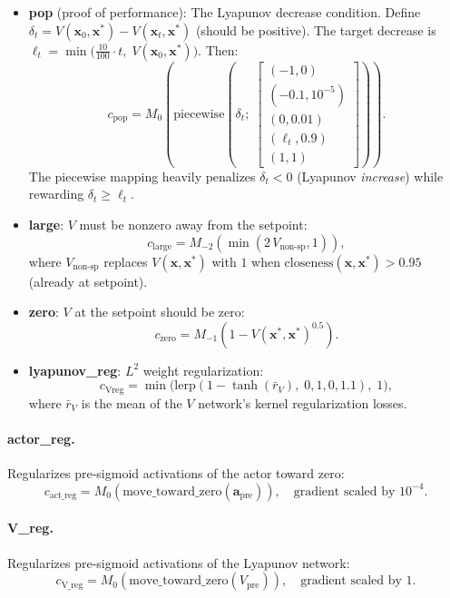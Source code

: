 \documentclass[11pt]{article}
\newcommand{\pmean}[2]{M_{#1}\!\left(#2\right)}
\newcommand{\x}{\bm{x}}
\newcommand{\xstar}{\bm{x}^*}
\theoremstyle{definition}
\begin{document}
\begin{itemize}
    \item \textbf{pop} (proof of performance): The Lyapunov decrease condition.
    Define $\delta_t = V(\x_0, \xstar) - V(\x_t, \xstar)$ (should be positive).
    The target decrease is $\ell_t = \min\!\bigl(\tfrac{10}{100} \cdot t,\; V(\x_0, \xstar)\bigr)$.
    Then:
    \[
        c_{\text{pop}} = \pmean{0}{\text{piecewise}\!\left(
        \delta_t;\;
        \begin{bmatrix}(-1, 0)\\(-0.1, 10^{-5})\\(0, 0.01)\\(\ell_t, 0.9)\\(1, 1)\end{bmatrix}
        \right)}.
    \]
    The piecewise mapping heavily penalizes $\delta_t < 0$ (Lyapunov \emph{increase})
    while rewarding $\delta_t \geq \ell_t$.

    \item \textbf{large}: $V$ must be nonzero away from the setpoint:
    \[
        c_{\text{large}} = \pmean{-2}{\min(2\,V_{\text{non-sp}}, 1)},
    \]
    where $V_{\text{non-sp}}$ replaces $V(\x, \xstar)$ with $1$ when
    $\text{closeness}(\x, \xstar) > 0.95$ (already at setpoint).

    \item \textbf{zero}: $V$ at the setpoint should be zero:
    \[
        c_{\text{zero}} = \pmean{-1}{1 - V(\xstar, \xstar)^{0.5}}.
    \]

    \item \textbf{lyapunov\_reg}: $L^2$ weight regularization:
    \[
        c_{\text{Vreg}} = \min\!\bigl(\text{lerp}(1 - \tanh(\bar{r}_V),\; 0, 1, 0, 1.1),\; 1\bigr),
    \]
    where $\bar{r}_V$ is the mean of the $V$ network's kernel regularization losses.
\end{itemize}

\paragraph{actor\_reg.}
Regularizes pre-sigmoid activations of the actor toward zero:
\[
    c_{\text{act\_reg}} = \pmean{0}{\text{move\_toward\_zero}(\bm{a}_{\text{pre}})},
    \quad \text{gradient scaled by } 10^{-4}.
\]

\paragraph{V\_reg.}
Regularizes pre-sigmoid activations of the Lyapunov network:
\[
    c_{\text{V\_reg}} = \pmean{0}{\text{move\_toward\_zero}(V_{\text{pre}})},
    \quad \text{gradient scaled by } 1.
\]
\end{document}
